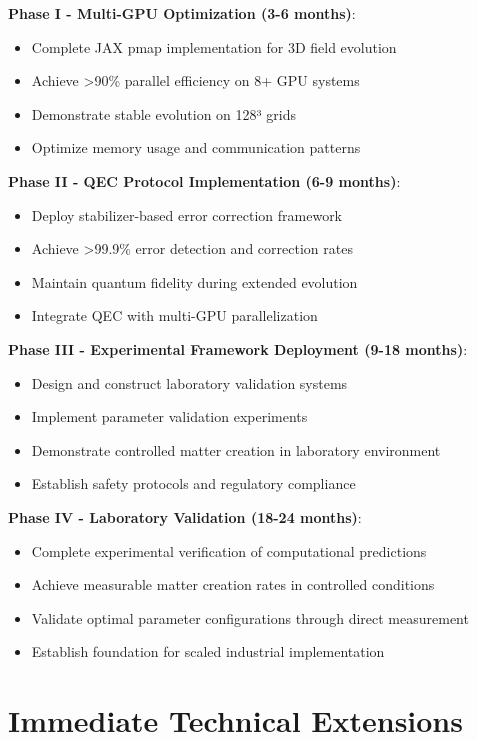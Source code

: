 \documentclass[11pt]{article}
\begin{document}
\textbf{Phase I - Multi-GPU Optimization (3-6 months)}:
\begin{itemize}
\item Complete JAX pmap implementation for 3D field evolution
\item Achieve >90\% parallel efficiency on 8+ GPU systems
\item Demonstrate stable evolution on 128³ grids
\item Optimize memory usage and communication patterns
\end{itemize}

\textbf{Phase II - QEC Protocol Implementation (6-9 months)}:
\begin{itemize}
\item Deploy stabilizer-based error correction framework
\item Achieve >99.9\% error detection and correction rates
\item Maintain quantum fidelity during extended evolution
\item Integrate QEC with multi-GPU parallelization
\end{itemize}

\textbf{Phase III - Experimental Framework Deployment (9-18 months)}:
\begin{itemize}
\item Design and construct laboratory validation systems
\item Implement parameter validation experiments
\item Demonstrate controlled matter creation in laboratory environment
\item Establish safety protocols and regulatory compliance
\end{itemize}

\textbf{Phase IV - Laboratory Validation (18-24 months)}:
\begin{itemize}
\item Complete experimental verification of computational predictions
\item Achieve measurable matter creation rates in controlled conditions
\item Validate optimal parameter configurations through direct measurement
\item Establish foundation for scaled industrial implementation
\end{itemize}

\section{Immediate Technical Extensions}
\end{document}
